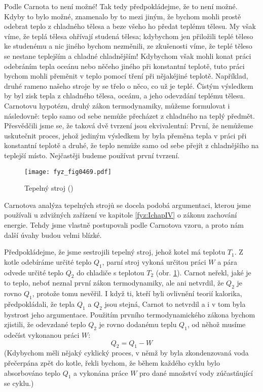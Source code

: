     Podle Carnota to není možné! Tak tedy předpokládejme, že to není možné. Kdyby to bylo možné,
    znamenalo by to mezi jiným, že bychom mohli prostě odebrat teplo z chladného tělesa a beze všeho
    ho předat teplému tělesu. My však víme, že teplá tělesa ohřívají studená tělesa; kdybychom jen
    přiložili teplé těleso ke studenému a nic jiného bychom nezměnili, ze zkušenosti víme, že teplé
    těleso se nestane teplejším a chladné chladnějším! Kdybychom však mohli konat práci odebráním
    tepla oceánu nebo něčeho jiného při konstantní teplotě, tuto práci bychom mohli přeměnit v teplo
    pomocí tření při nějakéjiné teplotě. Například, druhé rameno našeho stroje by se třelo o něco,
    co už je teplé. Čistým výsledkem by byl zisk tepla z chladného tělesa, oceánu, a jeho odevzdání
    teplému tělesu. Carnotovu hypotézu, druhý zákon termodynamiky, můžeme formulovat i následovně:
    teplo samo od sebe nemůže přecházet z chladného na teplý předmět. Přesvědčili jsme se, že taková
    dvě tvrzení jsou ekvivalentní: První, že nemůžeme uskutečnit proces, jehož jediným výsledkem by
    byla přeměna tepla v práci při konstantní teplotě a druhé, že teplo nemůže samo od sebe přejít z
    chladnějšího na teplejší místo. Nejčastěji budeme používat první tvrzení.

    \begin{figure}[ht!] %
      \centering
      \texttt{[image: fyz\_fig0469.pdf]}
      \caption{Tepelný stroj (\cite[s.~707]{Feynman01})}
      \label{fyz:fig0469}
    \end{figure}

    Carnotova analýza tepelných strojů se docela podobá argumentaci, kterou jsme používali u
    zdvižných zařízení ve kapitole \ref{fyz:IchapIV} o zákonu zachování energie. Tehdy jsme vlastně
    postupovali podle Carnotova vzoru, a proto nám další úvahy budou velmi blízké.

    Předpokládejme, že jsme sestrojili tepelný stroj, jehož kotel má teplotu \(T_1\). Z kotle
    odebíráme určité teplo \(Q_1\), parní stroj vykoná určitou práci \(W\) a pára odvede určité
    teplo \(Q_2\) do chladiče s teplotou \(T_2\) (obr. \ref{fyz:fig0469}). Carnot neřekl, jaké je to
    teplo, neboť neznal první zákon termodynamiky, ale ani netvrdil, že \(Q_2\) je rovno \(Q_1\),
    protože tomu nevěřil. I když ti, kteří byli ovlivnění teorií kalorika, předpokládali, že tepla
    \(Q_1\) a \(Q_2\) jsou stejná, Carnot to netvrdil a i v tom byla bystrost jeho argumentace.
    Použitím prvního termodynamického zákona bychom zjistili, že odevzdané teplo \(Q_2\) je rovno
    dodanému teplu \(Q_1\), od něhož musíme odečíst vykonanou práci \(W\):
    \begin{equation}\label{fyz:eq577}
      Q_2 = Q_1 - W
    \end{equation}
    (Kdybychom měli nějaký cyklický proces, v němž by byla zkondenzovaná voda přečerpána zpět do
    kotle, řekli bychom, že během každého cyklu bylo absorbováno teplo \(Q_1\) a vykonána práce
    \(W\) pro dané množství vody zúčastňující se cyklu.)

